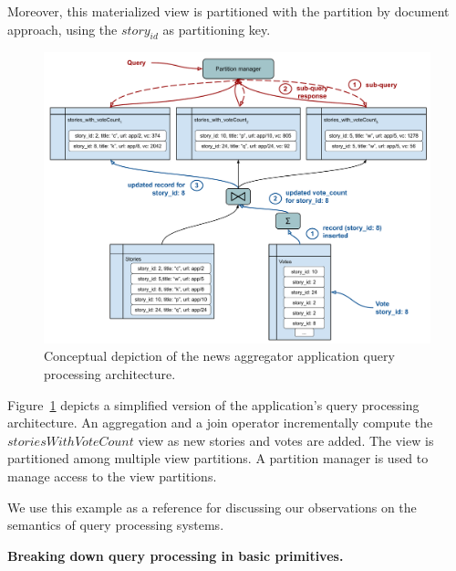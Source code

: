 Moreover, this materialized view is partitioned with the partition by document approach, using the $story_{id}$ as partitioning key.

\begin{figure}[H]
  \centering
    \includegraphics[width=\textwidth]{./figures/design_pattern/running_example.pdf}
    \caption{Conceptual depiction of the news aggregator application query processing architecture.}
    \label{fig:running_example}
\end{figure}


Figure~\ref{fig:running_example} depicts a simplified version of the application's query processing architecture.
An aggregation and a join operator incrementally compute the $storiesWithVoteCount$ view as new stories and votes are added.
The view is partitioned among multiple view partitions.
A partition manager is used to manage access to the view partitions.

We use this example as a reference for discussing our observations on the semantics of query processing systems.

\vspace{12pt}
\noindent
\textbf{Breaking down query processing in basic primitives.}

